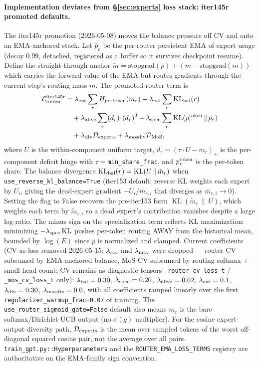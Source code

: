 \documentclass[11pt]{article}
\begin{document}
\paragraph{Implementation deviates from \S\ref{sec:experts} loss stack:
iter145r promoted defaults.} The iter145r promotion (2026-05-08) moves the
balance pressure off CV and onto an EMA-anchored stack.  Let
$\bar p_e$ be the per-router persistent EMA of expert usage (decay $0.99$,
detached, registered as a buffer so it survives checkpoint resume).  Define
the straight-through anchor $\tilde m = \mathrm{stopgrad}(\bar p) + (m - \mathrm{stopgrad}(m))$
which carries the forward value of the EMA but routes gradients through the
current step's routing mass $m$.  The promoted router term is
\[
\begin{aligned}
\mathcal{L}_{\rm router}^{\rm iter145r}
  &= \lambda_{\rm ent}\sum_r H_{\rm pertoken}(m_r)
     + \lambda_{\rm bal}\sum_r \operatorname{KL}_{\rm bal}(r) \\
  &\quad + \lambda_{\rm alive}\sum_r (\bar d_r)\!\cdot\!(d_r)^2
     - \lambda_{\rm spec}\sum_r \operatorname{KL}(p^{\rm token}_r\,\|\,\bar p_r) \\
  &\quad + \lambda_{\rm div}\mathcal{D}_{\rm experts}
     + \lambda_{\rm mosdiv}\mathcal{D}_{\rm MoS},
\end{aligned}
\]
where $U$ is the within-component uniform target,
$d_r = (\tau \cdot U - m_r)_+$ is the per-component deficit hinge with
$\tau=$\texttt{min\_share\_frac}, and $p^{\rm token}_r$ is the per-token share.
The balance divergence
$\operatorname{KL}_{\rm bal}(r) = \operatorname{KL}(U\,\|\,\tilde m_r)$
when \texttt{use\_reverse\_kl\_balance=True} (iter153 default; reverse KL
weights each expert by $U_i$, giving the dead-expert gradient $-U_i/\bar m_{r,i}$
that diverges as $\bar m_{r,i}\!\to\!0$).  Setting the flag to False recovers
the pre-iter153 form $\operatorname{KL}(\tilde m_r\,\|\,U)$, which weights each
term by $\tilde m_{r,i}$ so a dead expert's contribution vanishes despite a
large log-ratio.
The minus sign on the specialization term reflects KL maximization: minimizing
$-\lambda_{\rm spec}\,\mathrm{KL}$ pushes per-token routing AWAY from the
historical mean, bounded by $\log(E)$ since $\bar p$ is normalized and clamped.
Current coefficients (CV-as-loss removed 2026-05-15: $\lambda_{\rm rcv}$ and
$\lambda_{\rm mcv}$ were dropped — router CV subsumed by EMA-anchored balance,
MoS CV subsumed by routing softmax + small head count; CV remains as
diagnostic tensors \texttt{\_router\_cv\_loss\_t} / \texttt{\_mos\_cv\_loss\_t}
only):
$\lambda_{\rm bal}=0.30$, $\lambda_{\rm spec}=0.20$, $\lambda_{\rm alive}=0.02$,
$\lambda_{\rm ent}=0.1$, $\lambda_{\rm div}=0.30$,
$\lambda_{\rm mosdiv}=0.0$, with all coefficients ramped linearly over the
first \texttt{regularizer\_warmup\_frac=0.07} of training.  The
\texttt{use\_router\_sigmoid\_gate=False} default also means $m_r$ is the bare
softmax/Dirichlet-UCB output (no $\sigma(g)$ multiplier).  For the cosine
expert-output diversity path, $\mathcal{D}_{\rm experts}$ is the mean over
sampled tokens of the worst off-diagonal squared cosine pair, not the average
over all pairs.  \texttt{train\_gpt.py::Hyperparameters} and the
\texttt{ROUTER\_EMA\_LOSS\_TERMS} registry are authoritative on the EMA-family
sign convention.
\end{document}
